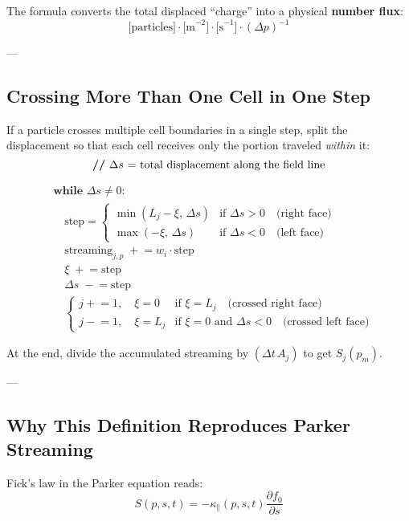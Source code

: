 The formula converts the total displaced ``charge'' into a physical \textbf{number flux}:
\[
\text{[particles]} \cdot \text{[m}^{-2}\text{]} \cdot \text{[s}^{-1}\text{]} \cdot (\Delta p)^{-1}
\]

---

\subsection*{Crossing More Than One Cell in One Step}

If a particle crosses multiple cell boundaries in a single step, split the displacement so that each cell receives only the portion traveled \emph{within} it:
\[
\text{\textbf{//} \(\Delta s\) = total displacement along the field line}
\]

\[
\begin{aligned}
&\textbf{while } \Delta s \ne 0: \\
&\quad \text{step} =
\begin{cases}
\min(L_j - \xi,\, \Delta s) & \text{if } \Delta s > 0 \quad \text{(right face)} \\
\max(-\xi,\, \Delta s)      & \text{if } \Delta s < 0 \quad \text{(left face)}
\end{cases} \\
&\quad \text{streaming}_{j,p} \;\mathrel{+}= w_i \cdot \text{step} \\
&\quad \xi \;\mathrel{+}= \text{step} \\
&\quad \Delta s \;\mathrel{-}= \text{step} \\
&\quad
\begin{cases}
j \mathrel{+}= 1,\quad \xi = 0 & \text{if } \xi = L_j \quad \text{(crossed right face)} \\
j \mathrel{-}= 1,\quad \xi = L_j & \text{if } \xi = 0 \text{ and } \Delta s < 0 \quad \text{(crossed left face)}
\end{cases}
\end{aligned}
\]


At the end, divide the accumulated streaming by $(\Delta t\, A_j)$ to get $S_j(p_m)$.

---

\subsection*{Why This Definition Reproduces Parker Streaming}

Fick’s law in the Parker equation reads:
\[
S(p, s, t) = -\kappa_\parallel(p, s, t)
\frac{\partial f_0}{\partial s}
\]

